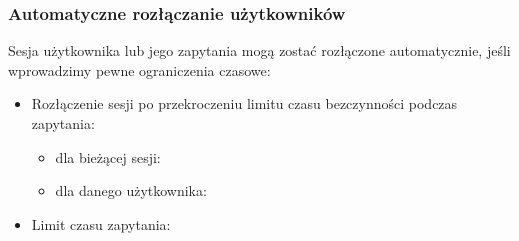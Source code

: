 \documentclass[a4paper,11pt,openany,english]{sphinxmanual}
\begin{document}
\subsubsection{Automatyczne rozłączanie użytkowników}
\label{\detokenize{rozdzial2/Kontrola_i_konserwacja/kontrola_i_konserwacja:automatyczne-rozlaczanie-uzytkownikow}}
\sphinxAtStartPar
Sesja użytkownika lub jego zapytania mogą zostać rozłączone automatycznie, jeśli wprowadzimy pewne ograniczenia czasowe:
\begin{itemize}
\item {} 
\sphinxAtStartPar
Rozłączenie sesji po przekroczeniu limitu czasu bezczynności podczas zapytania:
\begin{itemize}
\item {} 
\sphinxAtStartPar
dla bieżącej sesji:
\begin{quote}

\begin{sphinxVerbatim}[commandchars=\\\{\}]
\end{sphinxVerbatim}
\end{quote}

\item {} 
\sphinxAtStartPar
dla danego użytkownika:
\begin{quote}

\begin{sphinxVerbatim}[commandchars=\\\{\}]
\end{sphinxVerbatim}
\end{quote}

\end{itemize}

\item {} 
\sphinxAtStartPar
Limit czasu zapytania:
\begin{quote}

\begin{sphinxVerbatim}[commandchars=\\\{\}]
\end{sphinxVerbatim}
\end{quote}

\end{itemize}
\end{document}

